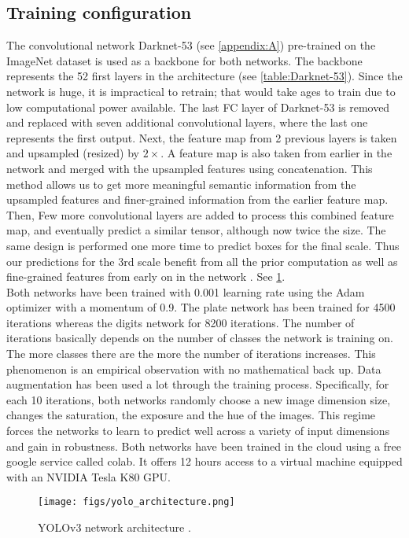 \subsection{Training configuration}\label{subsubsection:tc}
The convolutional network Darknet-53 (see \cref{appendix:A}) pre-trained on the ImageNet dataset is used as a backbone for both networks. The backbone
represents the 52 first layers in the architecture (see \cref{table:Darknet-53}). Since the network is huge, it is impractical to retrain; that would take ages to train due to low computational power available. The last FC layer of Darknet-53 is removed and replaced with seven additional convolutional layers, where the last one represents the first output. Next, the feature map from 2 previous layers is taken and upsampled (resized) by $2 \times$. A feature map is also taken from earlier in the network and merged with the upsampled features
using concatenation. This method allows us to get more meaningful semantic information from the upsampled features and finer-grained information from the earlier feature map. Then, Few more convolutional layers are added to process this combined feature map, and eventually predict a similar tensor, although now twice the size. The same design is performed one more time to predict boxes for the final scale. Thus our predictions for the 3rd scale benefit from all the prior computation as well as fine-grained features from early on in the network \cite{YOLOv3}. See \cref{fig:arch}. \\
Both networks have been trained with 0.001 learning rate using the Adam optimizer with a momentum of 0.9. The plate network has been trained for
4500 iterations whereas the digits network for 8200 iterations. The number of iterations basically depends on the number of classes the network
is training on. The more classes there are the more the number of iterations increases. This phenomenon is an empirical observation with no
mathematical back up. Data augmentation has been used a lot through the training process. Specifically, for each 10 iterations, both networks randomly choose a new image dimension size, changes the saturation, the exposure and the hue of the images. This regime forces the networks to learn to predict well across a variety of input dimensions and gain in robustness. Both networks have been trained in the cloud using a free google service called colab. It offers 12 hours access to a virtual machine equipped with an NVIDIA Tesla K80 GPU.

\begin{figure}[!htpb]
  \centering
  \texttt{[image: figs/yolo\_architecture.png]}
  \caption{YOLOv3 network architecture \cite{reference_1}.}\label{fig:arch}
\end{figure}

